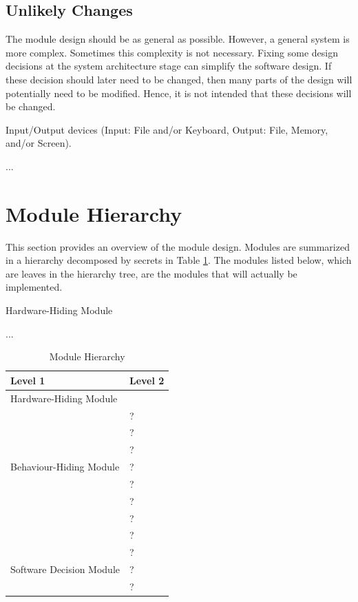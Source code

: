 \documentclass[12pt, titlepage]{article}
\newcounter{ucnum}
\newcommand{\uctheucnum}{UC\theucnum}
\newcounter{mnum}
\newcommand{\mthemnum}{M\themnum}
\begin{document}
\subsection{Unlikely Changes} \label{SecUchange}

The module design should be as general as possible. However, a general system is
more complex. Sometimes this complexity is not necessary. Fixing some design
decisions at the system architecture stage can simplify the software design. If
these decision should later need to be changed, then many parts of the design
will potentially need to be modified. Hence, it is not intended that these
decisions will be changed.

\begin{description}
\item[ \uctheucnum \label{ucIO}:] Input/Output devices
  (Input: File and/or Keyboard, Output: File, Memory, and/or Screen).
\item ...
\end{description}

\section{Module Hierarchy} \label{SecMH}

This section provides an overview of the module design. Modules are summarized
in a hierarchy decomposed by secrets in Table \ref{TblMH}. The modules listed
below, which are leaves in the hierarchy tree, are the modules that will
actually be implemented.

\begin{description}
\item [ \mthemnum \label{mHH}:] Hardware-Hiding Module
\item ...
\end{description}


\begin{table}[h!]
\centering
\begin{tabular}{p{} p{}}
\toprule
\textbf{Level 1} & \textbf{Level 2}\\
\midrule

{Hardware-Hiding Module} & ~ \\
\midrule

\multirow{7}{0.3\textwidth}{Behaviour-Hiding Module} & ?\\
& ?\\
& ?\\
& ?\\
& ?\\
& ?\\
& ?\\ 
& ?\\
\midrule

\multirow{3}{0.3\textwidth}{Software Decision Module} & {?}\\
& ?\\
& ?\\
\bottomrule

\end{tabular}
\caption{Module Hierarchy}
\label{TblMH}
\end{table}
\end{document}
